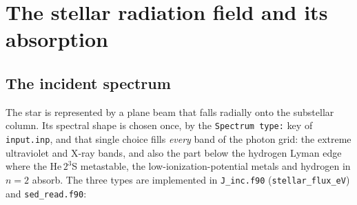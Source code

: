 \section{The stellar radiation field and its absorption}
\label{sec:radiation}

\subsection{The incident spectrum}
\label{sec:radiation:spectrum}

The star is represented by a plane beam that falls radially onto the
substellar column. Its spectral shape is chosen once, by the
\texttt{Spectrum type:} key of \texttt{input.inp}, and that single choice
fills \emph{every} band of the photon grid: the extreme ultraviolet and
X-ray bands, and also the part below the hydrogen Lyman edge where the
He\,$2^3$S metastable, the low-ionization-potential metals and hydrogen in
$n=2$ absorb. The three types are implemented in
\texttt{J\_inc.f90} (\texttt{stellar\_flux\_eV}) and
\texttt{sed\_read.f90}:

